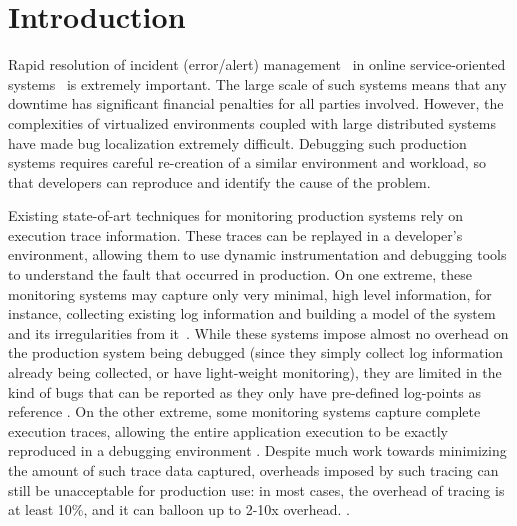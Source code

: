 \section{Introduction}
\label{sec:parikshanIntro}

Rapid resolution of incident (error/alert) management~\cite{sasase2013} in online service-oriented systems~\cite{microservice-book,hdfs,cassandra,redis} is extremely important.
The large scale of such systems means that any downtime has significant financial penalties for all parties involved.
However, the complexities of virtualized environments coupled with large distributed systems have made bug localization extremely difficult.
Debugging such production systems requires careful re-creation of a similar
environment and workload, so that developers can reproduce and identify the cause of the problem.

Existing state-of-art techniques for monitoring production systems rely on execution trace information. 
These traces can be replayed in a developer's environment, allowing them to use dynamic instrumentation and debugging tools to understand the fault that occurred in production.
On one extreme, these monitoring systems may capture only very minimal, high level information, for instance, collecting existing log information and building a model of the system and its irregularities from it~\cite{magpie,fay,failuresketching,problemsolvingSysTap}. 
While these systems impose almost no overhead on the production system being debugged (since they simply collect log information already being collected, or have light-weight monitoring), they are limited in the kind of bugs that can be reported as they only have pre-defined log-points as reference .
On the other extreme, some monitoring systems capture complete execution traces, allowing the entire application execution to be exactly reproduced in a debugging environment \cite{odr,revirt,laadan2010transparent,geels2007friday}.
Despite much work towards minimizing the amount of such trace data captured, overheads imposed by such tracing can still be unacceptable for production use: in most cases, the overhead of tracing is at least 10\%, and it can balloon up to 2-10x overhead. \cite{pinplay,drdebug}.

